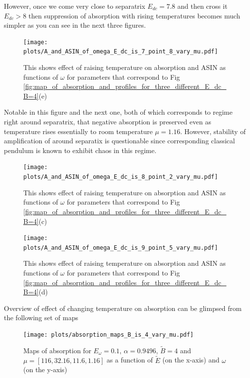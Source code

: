 \documentclass[40pt,letterpaper,physrev]{article}
\begin{document}
    However, once we come very close to separatrix $E_{dc} = 7.8$ and then cross it $E_{dc} > 8$ then suppression of
    absorption with rising temperatures becomes much simpler as you can see in the next three figures.
	\begin{figure}[H]
	  \centering
	  \normalsize %
	  \texttt{[image: plots/A\_and\_ASIN\_of\_omega\_E\_dc\_is\_7\_point\_8\_vary\_mu.pdf]}
	  \caption{This shows effect of raising temperature on absorption and ASIN as functions of $\omega$ for parameters
	  that correspond to Fig \ref{fig:map_of_absorption_and_profiles_for_three_different_E_dc_B=4}(e)}
	  \label{fig:E_dc=7.8_B=4_different_mu}	  
	\end{figure}
	Notable in this figure and the next one, both of which corresponds to regime right around separatrix, that
	negative absorption is preserved even as temperature rises essentially to room temperature $\mu = 1.16$. 
	However, stability of amplification of around separatix is questionable since corresponding classical 
	pendulum is known to exhibit chaos in this regime.
	\begin{figure}[H]
	  \centering
	  \normalsize %
	  \texttt{[image: plots/A\_and\_ASIN\_of\_omega\_E\_dc\_is\_8\_point\_2\_vary\_mu.pdf]}
	  \caption{This shows effect of raising temperature on absorption and ASIN as functions of $\omega$ for parameters 
	  that correspond to Fig \ref{fig:map_of_absorption_and_profiles_for_three_different_E_dc_B=4}(c)}
	  \label{fig:E_dc=8.2_B=4_different_mu}
	\end{figure}
	\begin{figure}[H]
	  \centering
	  \normalsize %
	  \texttt{[image: plots/A\_and\_ASIN\_of\_omega\_E\_dc\_is\_9\_point\_5\_vary\_mu.pdf]}
	  \caption{This shows effect of raising temperature on absorption and ASIN as functions of $\omega$ for
      parameters that correspond to Fig \ref{fig:map_of_absorption_and_profiles_for_three_different_E_dc_B=4}(d)}
	  \label{fig:E_dc=9.5_B=4_different_mu}	  
	\end{figure}
    Overview of effect of changing temperature on absorption can be glimpsed from the following set of maps
	\begin{figure}[H]
	  \centering
	  \normalsize %
	  \texttt{[image: plots/absorption\_maps\_B\_is\_4\_vary\_mu.pdf]}
	  \caption{Maps of absorption for $E_\omega=0.1$, $\alpha=0.9496$, $\tilde{B}=4$ and $\mu=[116, 32.16, 11.6, 1.16]$
	  as a function of $\tilde{E}$ (on the x-axis) and $\omega$ (on the y-axis)}
	  \label{fig:absorption}	  
	\end{figure}    
    
\end{document}
